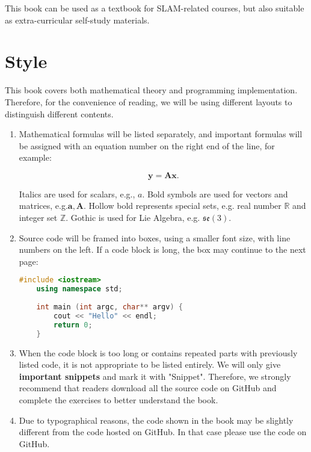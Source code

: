 This book can be used as a textbook for SLAM-related courses, but also suitable as extra-curricular self-study materials.

\section{Style}

This book covers both mathematical theory and programming implementation. Therefore, for the convenience of reading, we will be using different layouts to distinguish different contents.

\begin{enumerate}
	\item Mathematical formulas will be listed separately, and important formulas will be assigned with an equation number on the right end of the line, for example:
	
	\begin{equation}
	\mathbf{y} =\mathbf{A}\mathbf{x}.
	\end{equation}
	
	Italics are used for scalars, e.g., $a$. Bold symbols are used for vectors and matrices, e.g.$\mathbf{a}, \mathbf{A}$. Hollow bold represents special sets, e.g. real number $\mathbb{R}$ and integer set $\mathbb{Z}$. Gothic is used for Lie Algebra, e.g. $\mathfrak{se}(3)$.
	
	\item Source code will be framed into boxes, using a smaller font size, with line numbers on the left. If a code block is long, the box may continue to the next page:
	\begin{lstlisting}[language=C++]
	#include <iostream>
	using namespace std;
	
	int main (int argc, char** argv) {
		cout << "Hello" << endl;
		return 0;
	}
	\end{lstlisting}
	
	\item When the code block is too long or contains repeated parts with previously listed code, it is not appropriate to be listed entirely. We will only give \textbf{important snippets} and mark it with "Snippet". Therefore, we strongly recommend that readers download all the source code on GitHub and complete the exercises to better understand the book.
	
	\item Due to typographical reasons, the code shown in the book may be slightly different from the code hosted on GitHub. In that case please use the code on GitHub.
	

\end{enumerate}
